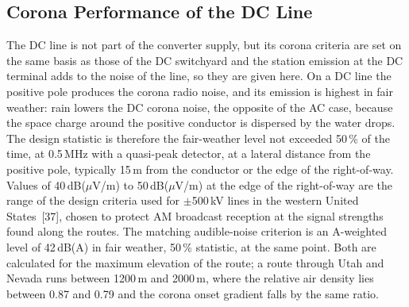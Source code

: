 \subsection{Corona Performance of the DC Line}
\label{sec:dc-line-corona}

The DC line is not part of the converter supply, but its corona criteria are
set on the same basis as those of the DC switchyard and the station emission
at the DC terminal adds to the noise of the line, so they are given here. On a
DC line the positive pole produces the corona radio noise, and its emission
is highest in fair weather: rain lowers the DC corona noise, the opposite of
the AC case, because the space charge around the positive conductor is
dispersed by the water drops. The design statistic is therefore the fair-weather level not exceeded 50\,\% of the time, at 0.5\,MHz with a quasi-peak
detector, at a lateral distance from the positive pole, typically 15\,m from
the conductor or the edge of the right-of-way. Values of 40\,dB($\mu$V/m) to
50\,dB($\mu$V/m) at the edge of the right-of-way are the range of the design
criteria used for $\pm$500\,kV lines in the western United States~[37], chosen
to protect AM broadcast reception at the signal strengths found along the
routes. The matching audible-noise criterion is an A-weighted level of
42\,dB(A) in fair weather, 50\,\% statistic, at the same point. Both are
calculated for the maximum elevation of the route; a route through Utah and
Nevada runs between 1200\,m and 2000\,m, where the relative air density lies
between 0.87 and 0.79 and the corona onset gradient falls by the same ratio.
\FloatBarrier
